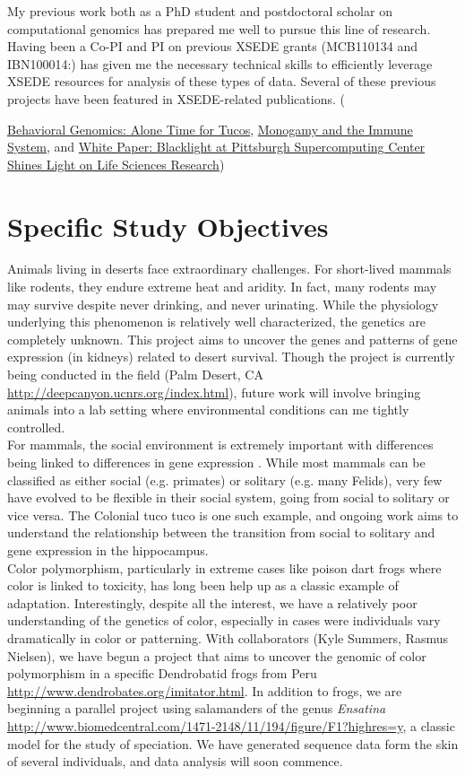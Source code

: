 \documentclass[10.5pt]{article}
\begin{document}
\noindent
My previous work both as a PhD student and postdoctoral scholar on computational genomics has prepared me well to pursue this line of research. Having been a Co-PI and PI on previous XSEDE grants (MCB110134 and IBN100014:) has given me the necessary technical skills to efficiently leverage XSEDE resources for analysis of these types of data. Several of these previous projects have been featured in XSEDE-related publications. ({\href{http://goo.gl/3lXKf}{Behavioral Genomics: Alone Time for Tucos}, \href{http://goo.gl/fasl6}{Monogamy and the Immune System}, and \href{http://goo.gl/iGKSN}{White Paper: Blacklight at Pittsburgh Supercomputing Center Shines Light on Life Sciences Research})

\section*{Specific Study Objectives}

Animals living in deserts face extraordinary challenges. For short-lived mammals like rodents, they endure extreme heat and aridity. In fact, many rodents may may survive despite never drinking, and never urinating. While the physiology underlying this phenomenon is relatively well characterized, the genetics are completely unknown. This project aims to uncover the genes and patterns of gene expression (in kidneys) related to desert survival. Though the project is currently being conducted in the field (Palm Desert, CA \url{http://deepcanyon.ucnrs.org/index.html}), future work will involve bringing animals into a lab setting where environmental conditions can me tightly controlled. \\

\noindent
For mammals, the social environment is extremely important with differences being linked to differences in gene expression \citep{WINSLOW:1993vr}. While most mammals can be classified as either social (e.g. primates) or solitary (e.g. many Felids), very few have evolved to be flexible in their social system, going from social to solitary or vice versa. The Colonial tuco tuco is one such example, and ongoing work aims to understand the relationship between the transition from social to solitary and gene expression in the hippocampus. \\

\noindent
Color polymorphism, particularly in extreme cases like poison dart frogs where color is linked to toxicity, has long been help up as a classic example of adaptation. Interestingly, despite all the interest, we have a relatively poor understanding of the genetics of color, especially in cases were individuals vary dramatically in color or patterning. With collaborators (Kyle Summers, Rasmus Nielsen), we have begun a project that aims to uncover the genomic of color polymorphism in a specific Dendrobatid frogs from Peru \url{http://www.dendrobates.org/imitator.html}.  In addition to frogs, we are beginning a parallel project using salamanders of the genus \textit{Ensatina} \url{http://www.biomedcentral.com/1471-2148/11/194/figure/F1?highres=y}, a classic model for the study of speciation.  We have generated sequence data form the skin of several individuals, and data analysis will soon commence.   


}
\end{document}
